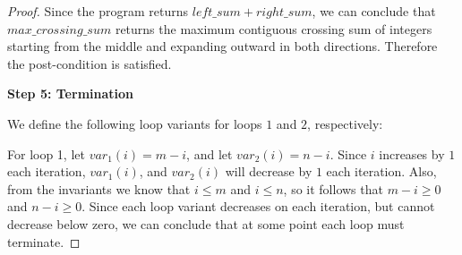 \begin{proof}
    Since the program returns $left\_sum + right\_sum$, we can conclude
    that $max\_crossing\_sum$ returns the maximum contiguous crossing sum of
    integers starting from the middle and expanding outward in both
    directions. Therefore the post-condition is satisfied.
    
    \vspace{10mm}
    \textbf{Step 5: Termination}
    
    \vspace{5mm}
    We define the following loop variants for loops $1$ and $2$,
    respectively:
    
    For loop 1, let $var_1(i) = m - i$, and let 
    $var_2(i) = n - i$. Since $i$ increases by $1$ each iteration, 
    $var_1(i)$, and $var_2(i)$ will decrease by $1$ each iteration.
    Also, from the invariants we know that
    $i \leqslant m$ and $i \leqslant n$, so it follows that 
    $m - i \geqslant 0$ and $n - i \geqslant 0$. Since each loop
    variant decreases on each iteration, but cannot decrease below
    zero, we can conclude that at some point each loop must terminate.
    
    \end{proof}

\newpage

